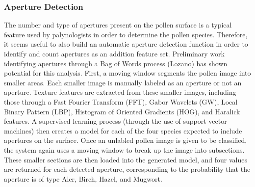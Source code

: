 \subsubsection{Aperture Detection}

The number and type of apertures present on the pollen surface is a typical feature used by palynologists in order to determine the pollen species. Therefore, it seems useful to also build an automatic aperture detection function in order to identify and count apertures as an addition feature set. Preliminary work identifying apertures through a Bag of Words process (Lozano) has shown potential for this analysis.
First, a moving window segments the pollen image into smaller areas. Each smaller image is manually labeled as an aperture or not an aperture. Texture features are extracted from these smaller images, including those through a Fast Fourier Transform (FFT), Gabor Wavelets (GW), Local Binary Pattern (LBP), Histogram of Oriented Gradients (HOG), and Haralick features. A supervised learning process (through the use of support vector machines) then creates a model for each of the four species expected to include apertures on the surface.
Once an unlabled pollen image is given to be classified, the system again uses a moving window to break up the image into subsections. These smaller sections are then loaded into the generated model, and four values are returned for each detected aperture, corresponding to the probability that the aperture is of type Aler, Birch, Hazel, and Mugwort. 

    
    
  
  
  